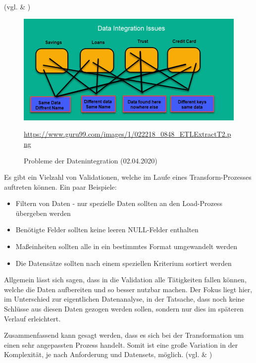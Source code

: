 (vgl. \cite{ETL-Process} \& \cite{ETL-Explained})
\begin{figure}[H]
    \centering
    \includegraphics[scale=0.5]{images/etl-integration-issues.png}
    \caption{Probleme der Datenintegration (02.04.2020)}
    \url{https://www.guru99.com/images/1/022218_0848_ETLExtractT2.png}
\end{figure}
\newpage
Es gibt ein Vielzahl von Validationen, welche im Laufe eines Transform-Prozesses auftreten können. Ein paar Beispiele:
\begin{itemize}
    \item Filtern von Daten - nur spezielle Daten sollten an den Load-Prozess übergeben werden
    \item Benötigte Felder sollten keine leeren NULL-Felder enthalten
    \item Maßeinheiten sollten alle in ein bestimmtes Format umgewandelt werden
    \item Die Datensätze sollten nach einem speziellen Kriterium sortiert werden
\end{itemize}
Allgemein lässt sich sagen, dass in die Validation alle Tätigkeiten fallen können, welche die Daten aufbereiten und so besser nutzbar machen. Der Fokus liegt hier, im Unterschied zur eigentlichen Datenanalyse, in der Tatsache, dass noch keine Schlüsse aus diesen Daten gezogen werden sollen, sondern nur dies im späteren Verlauf erleichtert.
\vspace{5mm}\par
Zusammenfassend kann gesagt werden, dass es sich bei der Transformation um einen sehr angepassten Prozess handelt. Somit ist eine große Variation in der Komplexität, je nach Anforderung und Datensets, möglich.
(vgl. \cite{ETL-Process} \& \cite{ETL-Explained})